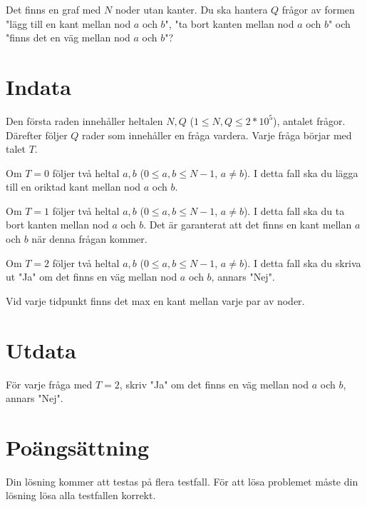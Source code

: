Det finns en graf med $N$ noder utan kanter. Du ska hantera $Q$ frågor av formen "lägg till en kant mellan
nod $a$ och $b$", "ta bort kanten mellan nod $a$ och $b$" och "finns det en väg mellan nod $a$ och $b$"?



\section*{Indata}
Den första raden innehåller heltalen $N, Q$ ($1 \leq N,Q \leq 2*10^5$), antalet frågor.
Därefter följer $Q$ rader som innehåller en fråga vardera. Varje fråga börjar med talet $T$.

Om $T=0$ följer två heltal $a,b$ ($0 \leq a,b \leq N-1$, $a \neq b$). I detta fall ska du lägga till en oriktad kant mellan nod $a$ och $b$.

Om $T=1$ följer två heltal $a,b$ ($0 \leq a,b \leq N-1$, $a \neq b$). I detta fall ska du ta bort kanten mellan nod $a$ och $b$. Det är 
garanterat att det finns en kant mellan $a$ och $b$ när denna frågan kommer.

Om $T=2$ följer två heltal $a,b$ ($0 \leq a,b \leq N-1$, $a \neq b$). I detta fall ska du skriva ut "Ja" om det finns en väg mellan nod
$a$ och $b$, annars "Nej".

Vid varje tidpunkt finns det max en kant mellan varje par av noder.

\section*{Utdata}
För varje fråga med $T=2$, skriv "Ja" om det finns en väg mellan nod $a$ och $b$, annars "Nej".

\section*{Poängsättning}
Din lösning kommer att testas på flera testfall.
\noindent
För att lösa problemet måste din lösning lösa alla testfallen korrekt.
